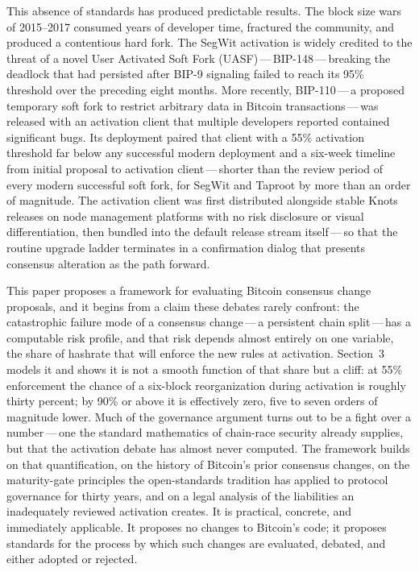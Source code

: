 \documentclass[11pt, twoside, openright]{book}
\begin{document}
This absence of standards has produced predictable results. The block size wars of 2015--2017 consumed years of developer time, fractured the community, and produced a contentious hard fork. The SegWit activation is widely credited to the threat of a novel User Activated Soft Fork (UASF)\,---\,BIP-148\,---\,breaking the deadlock that had persisted after BIP-9 signaling failed to reach its 95\% threshold over the preceding eight months. More recently, BIP-110\,---\,a proposed temporary soft fork to restrict arbitrary data in Bitcoin transactions\,---\,was released with an activation client that multiple developers reported contained significant bugs. Its deployment paired that client with a 55\% activation threshold far below any successful modern deployment and a six-week timeline from initial proposal to activation client\,---\,shorter than the review period of every modern successful soft fork, for SegWit and Taproot by more than an order of magnitude. The activation client was first distributed alongside stable Knots releases on node management platforms with no risk disclosure or visual differentiation, then bundled into the default release stream itself\,---\,so that the routine upgrade ladder terminates in a confirmation dialog that presents consensus alteration as the path forward.

This paper proposes a framework for evaluating Bitcoin consensus change proposals, and it begins from a claim these debates rarely confront: the catastrophic failure mode of a consensus change\,---\,a persistent chain split\,---\,has a computable risk profile, and that risk depends almost entirely on one variable, the share of hashrate that will enforce the new rules at activation. Section~3 models it and shows it is not a smooth function of that share but a cliff: at 55\% enforcement the chance of a six-block reorganization during activation is roughly thirty percent; by 90\% or above it is effectively zero, five to seven orders of magnitude lower. Much of the governance argument turns out to be a fight over a number\,---\,one the standard mathematics of chain-race security already supplies, but that the activation debate has almost never computed. The framework builds on that quantification, on the history of Bitcoin's prior consensus changes, on the maturity-gate principles the open-standards tradition has applied to protocol governance for thirty years, and on a legal analysis of the liabilities an inadequately reviewed activation creates. It is practical, concrete, and immediately applicable. It proposes no changes to Bitcoin's code; it proposes standards for the process by which such changes are evaluated, debated, and either adopted or rejected.
\end{document}
